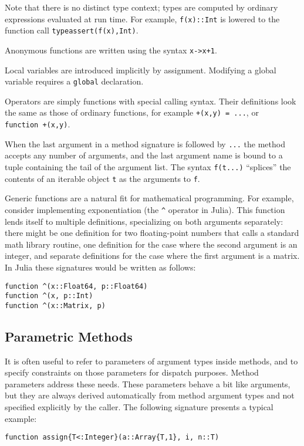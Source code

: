 \documentclass[9pt]{sigplanconf}
\begin{document}
Note that there is no distinct type context; types are computed by ordinary
expressions
evaluated at run time. For example, {\tt f(x)::Int} is lowered to the
function call {\tt typeassert(f(x),Int)}.

Anonymous functions are written using the syntax {\tt x->x+1}.

Local variables are introduced implicitly by assignment. Modifying a
global variable requires a {\tt global} declaration.

Operators are simply functions with special calling syntax. Their
definitions look the same as those of ordinary functions, for example
{\tt +(x,y)~=~...}, or {\tt function~+(x,y)}.

When the last argument in a method signature is followed by {\tt ...}
the method accepts any number of arguments, and the last argument name
is bound to a tuple containing the tail of the argument list. The syntax
{\tt f(t...)} ``splices'' the contents of an iterable object {\tt t} as the
arguments to {\tt f}.

Generic functions are a natural fit for mathematical programming. For example,
consider implementing exponentiation (the {\tt \^{}} operator in Julia).
This function
lends itself to multiple definitions, specializing on both arguments
separately: there might be one definition for two floating-point numbers that
calls a standard math library routine, one definition for the case where the
second argument is an integer, and separate definitions for the case where the
first argument is a matrix. In Julia these signatures would be written as
follows:

\begin{verbatim}
function ^(x::Float64, p::Float64)
function ^(x, p::Int)
function ^(x::Matrix, p)
\end{verbatim}

\subsection{Parametric Methods}

It is often useful to refer to parameters of argument types inside methods,
and to specify constraints on those parameters for dispatch purposes.
Method parameters address these needs. These parameters behave a bit like
arguments, but they are always derived automatically from
method argument types and not specified explicitly by the caller.
The following signature presents a typical example:

\begin{verbatim}
function assign{T<:Integer}(a::Array{T,1}, i, n::T)
\end{verbatim}
\end{document}
